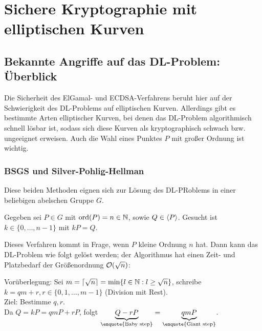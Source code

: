 \section{Sichere Kryptographie mit elliptischen Kurven}
\label{sec:para4}
\nextlecture
\subsection{Bekannte Angriffe auf das DL-Problem: Überblick}
\label{sub:4.1}
\begin{bem}
	Die Sicherheit des ElGamal- und ECDSA-Verfahrens beruht hier auf der Schwierigkeit des DL-Problems auf elliptischen Kurven. \marginnote{[19]}
	Allerdings gibt es bestimmte Arten elliptischer Kurven, bei denen das DL-Problem algorithmisch schnell lösbar ist, sodass sich diese Kurven als kryptographisch schwach bzw. ungeeignet erweisen.
	Auch die Wahl eines Punktes $P$ mit großer Ordnung ist wichtig.
\end{bem}

\subsubsection{BSGS und Silver-Pohlig-Hellman}
\label{subsub:4.1.1}
	Diese beiden Methoden eignen sich zur Lösung des DL-PRoblems in einer beliebigen abelschen Gruppe $G$.
	
\begin{defn}[DL-Problem in $G$]
	Gegeben sei $P \in G$ mit $\operatorname{ord}(P) = n \in \mathbb{N}$, sowie $Q \in \langle P\rangle$. Gesucht ist $k \in \{0,\dots,n-1\}$ mit $kP = Q$.
\end{defn}

\begin{defn}
	Dieses Verfahren kommt in Frage, wenn $P$ kleine Ordnung $n$ hat.
	Dann kann das DL-Problem wie folgt gelöst werden; der Algorithmus hat einen Zeit- und Platzbedarf der Größenordnung $\mathcal{O}(\sqrt{n})$: 
\end{defn}

\begin{bem}
	Vorüberlegung: Sei $m = \left\lceil\sqrt{n}\right\rceil = \min \{ l \in \mathbb{N} : l \geq \sqrt{n}\}$, schreibe $k = qm + r, r \in \{0,1,\dots,m-1\}$ (Division mit Rest). \\
	Ziel: Bestimme $q, r$. \\
	Da $Q = kP = qmP + rP$, folgt $\underbrace{Q - rP}_{\text{\enquote{Baby step}}} = \underbrace{qmP}_{\text{\enquote{Giant step}}}$.
\end{bem}


